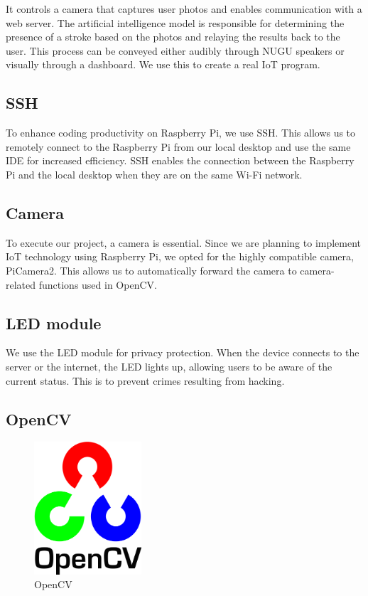 It controls a camera that captures user photos and enables communication with a web server. The artificial intelligence model is responsible for determining the presence of a stroke based on the photos and relaying the results back to the user. This process can be conveyed either audibly through NUGU speakers or visually through a dashboard. We use this to create a real IoT program.\\

\subsection{\textbf{SSH}}
To enhance coding productivity on Raspberry Pi, we use SSH. This allows us to remotely connect to the Raspberry Pi from our local desktop and use the same IDE for increased efficiency.
SSH enables the connection between the Raspberry Pi and the local desktop when they are on the same Wi-Fi network.\\

\subsection{\textbf{Camera}}
To execute our project, a camera is essential. Since we are planning to implement IoT technology using Raspberry Pi, we opted for the highly compatible camera, PiCamera2. This allows us to automatically forward the camera to camera-related functions used in OpenCV.\\

\subsection{\textbf{LED module}}
We use the LED module for privacy protection. When the device connects to the server or the internet, the LED lights up, allowing users to be aware of the current status. This is to prevent crimes resulting from hacking.\\

\subsection{\textbf{OpenCV}}

\begin{figure}[htp]
\centering
\includegraphics[width=4cm]{images/opencv.png}
\caption{OpenCV}
\label{fig:opencv}
\end{figure}

